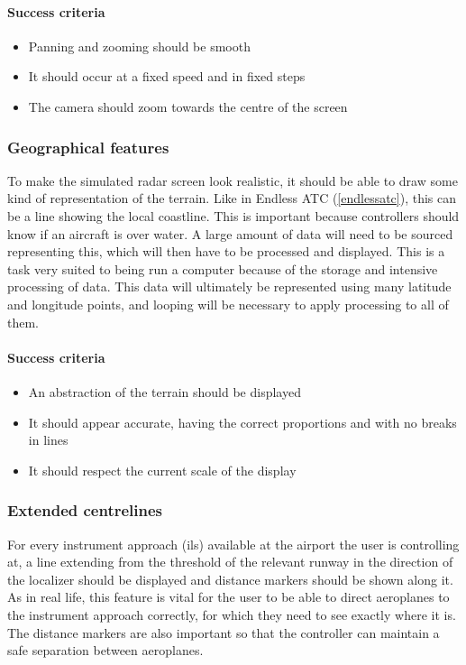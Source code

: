 \documentclass{article}
\begin{document}
\paragraph{Success criteria}
\begin{itemize}
    \item Panning and zooming should be smooth
    \item It should occur at a fixed speed and in fixed steps
    \item The camera should zoom towards the centre of the screen
\end{itemize}

\subsubsection{Geographical features}
To make the simulated radar screen look realistic, it should be able to draw some kind of representation of the terrain.
Like in Endless ATC (\ref{endlessatc}), this can be a line showing the local coastline.
This is important because controllers should know if an aircraft is over water.
A large amount of data will need to be sourced representing this, which will then have to be processed and displayed.
This is a task very suited to being run a computer because of the storage and intensive processing of data.
This data will ultimately be represented using many latitude and longitude points, and looping will be necessary to apply processing to all of them.

\paragraph{Success criteria}
\begin{itemize}
    \item An abstraction of the terrain should be displayed
    \item It should appear accurate, having the correct proportions and with no breaks in lines
    \item It should respect the current scale of the display
\end{itemize}

\subsubsection{Extended centrelines}
For every instrument approach (\acrshort{ils}) available at the airport the user is controlling at, a line extending from the threshold of the relevant runway in the direction of the localizer should be displayed and distance markers should be shown along it.
As in real life, this feature is vital for the user to be able to direct aeroplanes to the instrument approach correctly, for which they need to see exactly where it is.
The distance markers are also important so that the controller can maintain a safe separation between aeroplanes.
\end{document}
